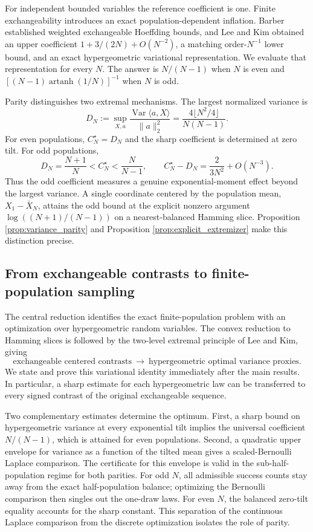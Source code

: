 \documentclass[11pt,a4paper]{article}
\DeclareMathOperator{\Var}{Var}\DeclareMathOperator{\Cov}{Cov}\DeclareMathOperator{\Hyp}{Hyp}\DeclareMathOperator{\Bern}{Bern}\DeclareMathOperator{\supp}{supp}\DeclareMathOperator{\artanh}{artanh}
\begin{document}
For independent bounded variables the reference coefficient is one. Finite exchangeability introduces an exact population-dependent inflation. Barber \cite{Barber,BarberErratum} established weighted exchangeable Hoeffding bounds, and Lee and Kim \cite{LeeKim} obtained an upper coefficient $1+3/(2N)+O(N^{-2})$, a matching order-$N^{-1}$ lower bound, and an exact hypergeometric variational representation. We evaluate that representation for every $N$. The answer is $N/(N-1)$ when $N$ is even and $[(N-1)\operatorname{artanh}(1/N)]^{-1}$ when $N$ is odd.

Parity distinguishes two extremal mechanisms. The largest normalized variance is
\[
 D_N:=\sup_{X,a}\frac{\Var\langle a,X\rangle}{\|a\|_2^2}
 =\frac{4\lfloor N^2/4\rfloor}{N(N-1)}.
\]
For even populations, $C_N^\star=D_N$ and the sharp coefficient is determined at zero tilt. For odd populations,
\[
 D_N=\frac{N+1}{N}<C_N^\star<\frac{N}{N-1},
 \qquad C_N^\star-D_N=\frac{2}{3N^2}+O(N^{-3}).
\]
Thus the odd coefficient measures a genuine exponential-moment effect beyond the largest variance. A single coordinate centered by the population mean, $X_1-\bar X_N$, attains the odd bound at the explicit nonzero argument $\log((N+1)/(N-1))$ on a nearest-balanced Hamming slice. Proposition \ref{prop:variance_parity} and Proposition \ref{prop:explicit_extremizer} make this distinction precise.

\subsection{From exchangeable contrasts to finite-population sampling}
The central reduction identifies the exact finite-population problem with an optimization over hypergeometric random variables. The convex reduction to Hamming slices is followed by the two-level extremal principle of Lee and Kim, giving
\[
 \text{exchangeable centered contrasts}\ \longrightarrow\
 \text{hypergeometric optimal variance proxies}.
\]
We state and prove this variational identity immediately after the main results. In particular, a sharp estimate for each hypergeometric law can be transferred to every signed contrast of the original exchangeable sequence.

Two complementary estimates determine the optimum. First, a sharp bound on hypergeometric variance at every exponential tilt implies the universal coefficient $N/(N-1)$, which is attained for even populations. Second, a quadratic upper envelope for variance as a function of the tilted mean gives a scaled-Bernoulli Laplace comparison. The certificate for this envelope is valid in the sub-half-population regime for both parities. For odd $N$, all admissible success counts stay away from the exact half-population balance; optimizing the Bernoulli comparison then singles out the one-draw laws. For even $N$, the balanced zero-tilt equality accounts for the sharp constant. This separation of the continuous Laplace comparison from the discrete optimization isolates the role of parity.
\end{document}
